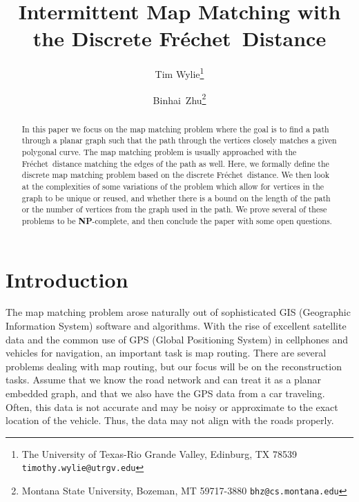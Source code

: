 \documentclass{article}[11pt]
\newcommand{\frechet}{Fr\'echet}
\newcommand{\dfd}{discrete \frechet\ distance}
\newcommand{\npc}{\textbf{NP}-complete}
\begin{document}
\title{Intermittent Map Matching with the Discrete \frechet\ Distance}



\author{Tim Wylie\thanks{The University of Texas-Rio Grande Valley, Edinburg, TX 78539  {\tt timothy.wylie@utrgv.edu}} \and Binhai~Zhu\thanks{Montana State University, Bozeman, MT 59717-3880  {\tt bhz@cs.montana.edu}}}




\date{}
\maketitle
\begin{abstract}
In this paper we focus on the map matching problem  
where the goal is to find a path through a planar graph such that the path through
the vertices closely matches a given polygonal curve.
The map matching problem is usually approached with the \frechet\ distance matching
the edges of the path as well.  Here, we formally define the discrete map matching problem 
based on the \dfd.  We then look at the complexities of
some variations of the problem which allow for vertices in the graph to be unique or
reused, and whether there is a bound on the length of the path or the number
of vertices from the graph used in the path.
We prove several of these problems to be \npc, and then conclude the paper with some open
questions.
\end{abstract}
\section{Introduction}


The map matching problem arose naturally out of sophisticated 
GIS (Geographic Information System) software and algorithms.  With the
rise of excellent satellite data and the common use of GPS (Global Positioning System) 
in cellphones and vehicles for navigation, an important task is map routing.
There are several problems dealing with map routing, but our focus will be on the 
reconstruction tasks.  Assume that we know the road network and can treat it
as a planar embedded graph, and that we also have the GPS data from a car
traveling.  Often, this data is not accurate and may be noisy or approximate to
the exact location of the vehicle.  Thus, the data may not align with the roads
properly.
\end{document}

